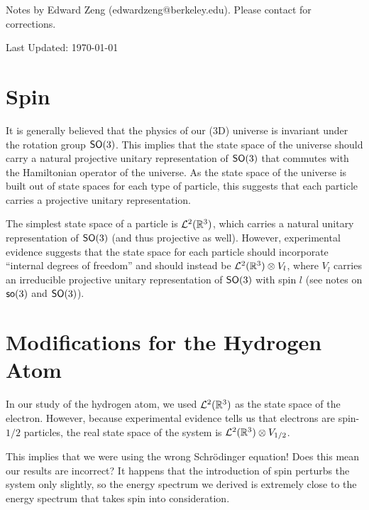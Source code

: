 \def\topic{Spin}



    \begin{center}
        \color{blue}
        \textsf{Notes by Edward Zeng (edwardzeng@berkeley.edu). Please contact for corrections.}

        \color{red}
        \textsf{Last Updated: \today}
    \end{center}

    \section{Spin}
    It is generally believed that the physics of our (3D) universe is invariant under the rotation group $\operatorname{\textsf{SO}}(3)$. This implies that the state space of the universe should carry a natural projective unitary representation of $\operatorname{\textsf{SO}}(3)$ that commutes with the Hamiltonian operator of the universe. As the state space of the universe is built out of state spaces for each type of particle, this suggests that each particle carries a projective unitary representation.

    The simplest state space of a particle is ${\mathcal L}^2({\mathbb R}^3)$, which carries a natural unitary representation of $\operatorname{\textsf{SO}}(3)$ (and thus projective as well). However, experimental evidence suggests that the state space for each particle should incorporate ``internal degrees of freedom'' and should instead be ${\mathcal L}^2({\mathbb R}^3) \otimes V_l$, where $V_l$ carries an irreducible projective unitary representation of $\operatorname{\textsf{SO}}(3)$ with spin $l$ (see notes on $\operatorname{\textsf{so}}(3)$ and $\operatorname{\textsf{SO}}(3)$).

    \section{Modifications for the Hydrogen Atom}
    In our study of the hydrogen atom, we used ${\mathcal L}^2({\mathbb R}^3)$ as the state space of the electron. However, because experimental evidence tells us that electrons are spin-$1/2$ particles, the real state space of the system is ${\mathcal L}^2({\mathbb R}^3) \otimes V_{1/2}$.

    This implies that we were using the wrong Schr\"{o}dinger equation! Does this mean our results are incorrect? It happens that the introduction of spin perturbs the system only slightly, so the energy spectrum we derived is extremely close to the energy spectrum that takes spin into consideration.


